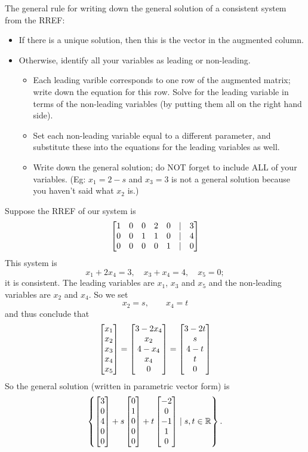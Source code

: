 The general rule for writing down the general solution of a consistent system from the RREF:
\begin{itemize}
\item If there is a unique solution, then this is the vector in the augmented
column.
\item Otherwise, identify all your variables as leading or non-leading.
\begin{itemize}
\item Each leading varible corresponds to one row of the augmented matrix; write
down the equation for this row.  Solve for the leading variable in terms of
the non-leading variables (by putting them all on the right hand side).
\item Set each non-leading variable equal to a different parameter, and substitute these into the equations for the leading variables as well.
\item Write down the general solution; do NOT forget to include ALL of your variables.  (Eg:  $x_1=2-s$ and $x_3 = 3$ is not a general solution because you haven't
said what $x_2$ is.)
\end{itemize}
\end{itemize}

\begin{myexample} Suppose the RREF of our system is
$$
\left[ \begin{matrix} 1 & 0 & 0 & 2 & 0 &|& 3\\
     0 & 0 & 1 & 1 & 0 &|& 4\\
     0 & 0 & 0 & 0 & 1 &|& 0 \end{matrix} \right]
$$
This system is 
$$
x_1 + 2x_4 = 3, \quad x_3 + x_4 = 4, \quad x_5=0;
$$
it is
consistent.  The leading variables are $x_1$, $x_3$ and $x_5$
and the non-leading variables are $x_2$ and $x_4$.  So we set
$$
x_2 = s, \qquad x_4 = t
$$
and thus conclude that
$$
\left[ \begin{matrix} x_1\\x_2\\x_3\\x_4\\x_5 \end{matrix} \right] = \left[ \begin{matrix} 3-2x_4\\ x_2 \\ 4-x_4\\ x_4 \\ 0 \end{matrix} \right] = \left[ \begin{matrix} 3-2t\\s\\4-t\\t\\0 \end{matrix} \right]
$$
So the general solution (written in parametric vector form) is
$$
\left\{ \left[ \begin{matrix} 3\\0\\4\\0\\0 \end{matrix} \right]+s\left[ \begin{matrix} 0\\1\\0\\0\\0 \end{matrix} \right] + t\left[ \begin{matrix} -2\\0\\-1\\1\\0 \end{matrix} \right] \mid s,t\in\mathbb{R}\right\}.
$$
\end{myexample}

